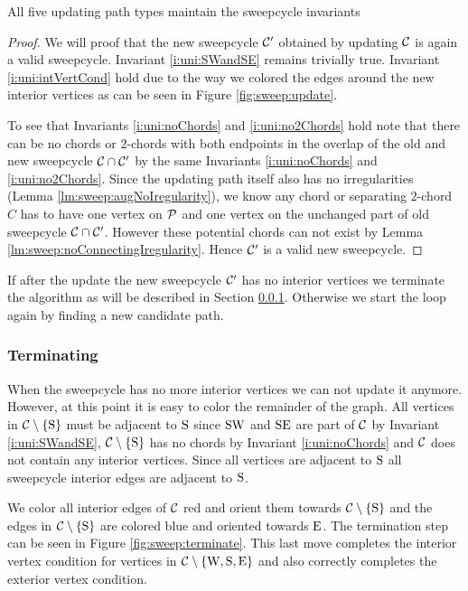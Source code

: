   \begin{lemma}
    \label{lm:sweep:updateMaintainsInvariants}
    All five updating path types maintain the sweepcycle invariants
  \end{lemma}
  \begin{proof}
    We will proof that the new sweepcycle $\C'$ obtained by updating $\C$ is again a valid sweepcycle. Invariant \ref{i:uni:SWandSE} remains trivially true. Invariant \ref{i:uni:intVertCond} hold due to the way we colored the edges around the new interior vertices as can be seen in Figure \ref{fig:sweep:update}.

    To see that Invariants \ref{i:uni:noChords} and \ref{i:uni:no2Chords} hold note that there can be no chords or $2$-chords with both endpoints in the overlap of the old and new sweepcycle $\C \cap \C'$ by the same Invariants \ref{i:uni:noChords} and \ref{i:uni:no2Chords}. Since the updating path itself also has no irregularities (Lemma \ref{lm:sweep:augNoIregularity}),
    we know any chord or separating $2$-chord $C$ has to have one vertex on $\P$ and one vertex on the unchanged part of old sweepcycle $\C \cap \C'$.
    However these potential chords can not exist by Lemma \ref{lm:sweep:noConnectingIregularity}.
    Hence $\C'$ is a valid new sweepcycle.
  \end{proof}

  If after the update the new sweepcycle $\C'$ has no interior vertices we terminate the algorithm as will be described in Section \ref{sss:terminating}. Otherwise we start the loop again by finding a new candidate path.

\subsubsection{Terminating}
  \label{sss:terminating}
  When the sweepcycle has no more interior vertices we can not update it anymore.
  However, at this point it is easy to color the remainder of the graph.
  All vertices in $\cpath$ must be adjacent to $\pS$ since $\pS \pW$ and $\pS \pE$ are part of $\C$ by Invariant \ref{i:uni:SWandSE}, $\cpath$ has no chords by Invariant \ref{i:uni:noChords} and $\C$ does not contain any interior vertices. Since all vertices are adjacent to $\pS$ all sweepcycle interior edges are adjacent to $\pS$.

  We color all interior edges of $\C$ red and orient them towards $\cpath$ and the edges in $\cpath$ are colored blue and oriented towards $\pE$. The termination step can be seen in Figure \ref{fig:sweep:terminate}. This last move completes the interior vertex condition for vertices in $\C \sm {\pW, \pS, \pE}$ and also correctly completes the exterior vertex condition.


